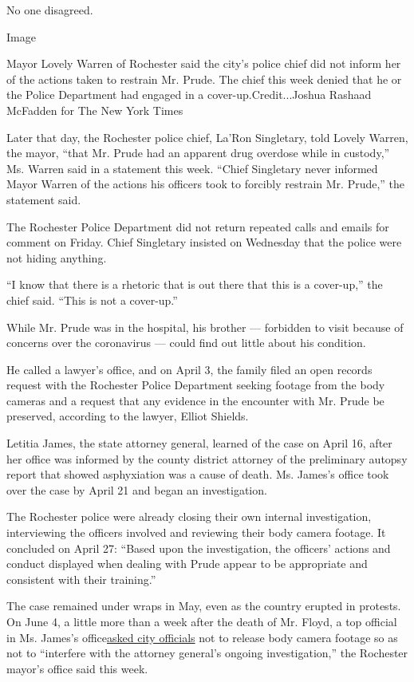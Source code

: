 No one disagreed.

Image

Mayor Lovely Warren of Rochester said the city's police chief did not
inform her of the actions taken to restrain Mr. Prude. The chief this
week denied that he or the Police Department had engaged in a
cover-up.Credit...Joshua Rashaad McFadden for The New York Times

Later that day, the Rochester police chief, La'Ron Singletary, told
Lovely Warren, the mayor, ``that Mr. Prude had an apparent drug overdose
while in custody,'' Ms. Warren said in a statement this week. ``Chief
Singletary never informed Mayor Warren of the actions his officers took
to forcibly restrain Mr. Prude,'' the statement said.

The Rochester Police Department did not return repeated calls and emails
for comment on Friday. Chief Singletary insisted on Wednesday that the
police were not hiding anything.

``I know that there is a rhetoric that is out there that this is a
cover-up,'' the chief said. ``This is not a cover-up.''

While Mr. Prude was in the hospital, his brother --- forbidden to visit
because of concerns over the coronavirus --- could find out little about
his condition.

He called a lawyer's office, and on April 3, the family filed an open
records request with the Rochester Police Department seeking footage
from the body cameras and a request that any evidence in the encounter
with Mr. Prude be preserved, according to the lawyer, Elliot Shields.

Letitia James, the state attorney general, learned of the case on April
16, after her office was informed by the county district attorney of the
preliminary autopsy report that showed asphyxiation was a cause of
death. Ms. James's office took over the case by April 21 and began an
investigation.

The Rochester police were already closing their own internal
investigation, interviewing the officers involved and reviewing their
body camera footage. It concluded on April 27: ``Based upon the
investigation, the officers' actions and conduct displayed when dealing
with Prude appear to be appropriate and consistent with their
training.''

The case remained under wraps in May, even as the country erupted in
protests. On June 4, a little more than a week after the death of Mr.
Floyd, a top official in Ms. James's
office\href{https://twitter.com/WHEC_AHyman/status/1301713197452361728}{asked
city officials} not to release body camera footage so as not to
``interfere with the attorney general's ongoing investigation,'' the
Rochester mayor's office said this week.

